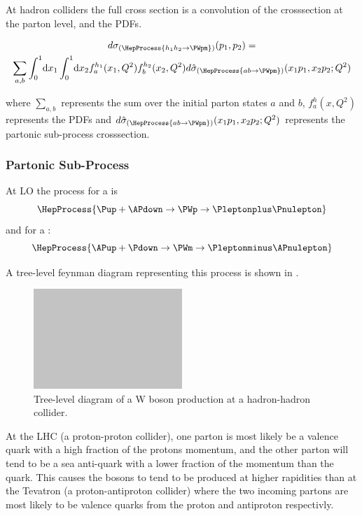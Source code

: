 At hadron colliders the full cross section is a convolution of the crosssection
at the parton level, and the \acp{PDF}.

\begin{multline}
  d\sigma_{(\HepProcess{h_1 h_2 \to \PWpm})}(p_1,p_2) = \\
  \sum\limits_{a,b}
  \int_0^1 \! \mathrm{d} x_1 
  \int_0^1 \! \mathrm{d} x_2 
  f_a^{h_1}(x_1,Q^2)
  f_b^{h_2}(x_2,Q^2) 
  d\hat{\sigma}_{(\HepProcess{a b \to \PWpm})}(x_1 p_1, x_2 p_2; Q^2)
  \label{wbos:xsec}
\end{multline}

where $\sum\limits_{a,b}$ represents the sum over the initial parton states $a$
and $b$, $f_a^{h}(x,Q^2)$ represents the \acp{PDF} and
$d\hat{\sigma}_{(\HepProcess{a b \to \PWpm})}(x_1 p_1, x_2 p_2; Q^2)$
represents the partonic sub-process crosssection.

\subsubsection*{Partonic Sub-Process}

At \ac{LO} the process for a \PWp is
\begin{equation}
  \HepProcess{\Pup + \APdown \to \PWp \to \Pleptonplus \Pnulepton} 
  \label{wbos:wpprod} 
\end{equation}
and for a \PWm:
\begin{equation}
  \HepProcess{\APup + \Pdown \to \PWm \to \Pleptonminus \APnulepton}
  \label{wbos:wmprod} 
\end{equation}

A tree-level feynman diagram representing this process is shown in
.

\begin{figure}[htb]
  \centering
  \includegraphics[width=0.5\textwidth]{placeholder}
  \caption{Tree-level diagram of a W boson production at a hadron-hadron collider.}
  \label{wbos:feynman}
\end{figure}

At the \ac{LHC} (a proton-proton collider), one parton is most likely be a
valence quark with a high fraction of the protons momentum, and the other
parton will tend to be a sea anti-quark with a lower fraction of the momentum
than the quark. This causes the \PW bosons to tend to be produced at higher
rapidities than at the Tevatron (a proton-antiproton collider) where the two
incoming partons are most likely to be valence quarks from the proton and
antiproton respectivly.

